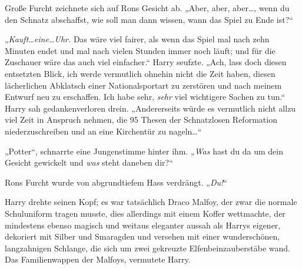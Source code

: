 Große Furcht zeichnete sich auf Rons Gesicht ab. „Aber, aber, aber…, wenn du den Schnatz abschaffst, wie soll man dann wissen, wann das Spiel zu Ende ist?“

„\emph{Kauft…eine…Uhr.} Das wäre viel fairer, als wenn das Spiel mal nach zehn Minuten endet und mal nach vielen Stunden immer noch läuft; und für die Zuschauer wäre das auch viel einfacher.“ Harry seufzte. „Ach, lass doch diesen entsetzten Blick, ich werde vermutlich ohnehin nicht die Zeit haben, diesen lächerlichen Abklatsch einer Nationalsportart zu zerstören und nach meinem Entwurf neu zu erschaffen. Ich habe sehr, \emph{sehr} viel wichtigere Sachen zu tun.“ Harry sah gedankenverloren drein. „Andererseits würde es vermutlich nicht allzu viel Zeit in Anspruch nehmen, die 95 Thesen der Schnatzlosen Reformation niederzuschreiben und an eine Kirchentür zu nageln…“

„Potter“, schnarrte eine Jungenstimme hinter ihm. „\emph{Was} hast du da um dein Gesicht gewickelt und \emph{was} steht daneben dir?“

Rons Furcht wurde von abgrundtiefem Hass verdrängt. „\emph{Du!}“

Harry drehte seinen Kopf; es war tatsächlich Draco Malfoy, der zwar die normale Schuluniform tragen musste, dies allerdings mit einem Koffer wettmachte, der mindestens ebenso magisch und weitaus eleganter aussah als Harrys eigener, dekoriert mit Silber und Smaragden und versehen mit einer wunderschönen, langzahnigen Schlange, die sich um zwei gekreuzte Elfenbeinzauberstäbe wand. Das Familienwappen der Malfoys, vermutete Harry.

